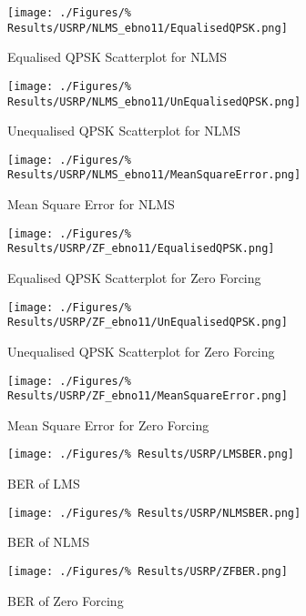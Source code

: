 \begin{figure}[ht]
	\centering
	\begin{minipage}{0.49\textwidth}
		\centering
		\texttt{[image: ./Figures/\%
		Results/USRP/NLMS\_ebno11/EqualisedQPSK.png]}
		\captionsetup{width=0.75\linewidth}
		\caption{Equalised QPSK Scatterplot for NLMS}
	\end{minipage}
	\begin{minipage}{0.49\textwidth}
		\centering
		\texttt{[image: ./Figures/\%
		Results/USRP/NLMS\_ebno11/UnEqualisedQPSK.png]}
		\captionsetup{width=0.75\linewidth}
		\caption{Unequalised QPSK Scatterplot for NLMS}
	\end{minipage}
\end{figure}
\begin{figure}[ht]
	\centering
	\texttt{[image: ./Figures/\%
	Results/USRP/NLMS\_ebno11/MeanSquareError.png]}
	\captionsetup{width=0.75\linewidth}
	\caption{Mean Square Error for NLMS}
\end{figure}

\begin{figure}[ht]
	\centering
	\begin{minipage}{0.49\textwidth}
		\centering
		\texttt{[image: ./Figures/\%
		Results/USRP/ZF\_ebno11/EqualisedQPSK.png]}
		\captionsetup{width=0.75\linewidth}
		\caption{Equalised QPSK Scatterplot for Zero 
		Forcing}
	\end{minipage}
	\begin{minipage}{0.49\textwidth}
		\centering
		\texttt{[image: ./Figures/\%
		Results/USRP/ZF\_ebno11/UnEqualisedQPSK.png]}
		\captionsetup{width=0.75\linewidth}
		\caption{Unequalised QPSK Scatterplot for Zero 
		Forcing}
	\end{minipage}
\end{figure}
\begin{figure}[ht]
	\centering
	\texttt{[image: ./Figures/\%
	Results/USRP/ZF\_ebno11/MeanSquareError.png]}
	\captionsetup{width=0.75\linewidth}
	\caption{Mean Square Error for Zero Forcing}
\end{figure}

\begin{figure}[ht]
	\centering
	\begin{minipage}{0.49\textwidth}
		\centering
		\texttt{[image: ./Figures/\%
		Results/USRP/LMSBER.png]}
		\captionsetup{width=0.75\linewidth}
		\caption{BER of LMS}
	\end{minipage}
	\begin{minipage}{0.49\textwidth}
		\centering
		\texttt{[image: ./Figures/\%
		Results/USRP/NLMSBER.png]}
		\captionsetup{width=0.75\linewidth}
		\caption{BER of NLMS}
		\label{fig:NLMS-BER-USRP}
	\end{minipage}
\end{figure}
\begin{figure}[ht]
	\centering
	\texttt{[image: ./Figures/\%
	Results/USRP/ZFBER.png]}
	\captionsetup{width=0.75\linewidth}
	\caption{BER of Zero Forcing}
\end{figure}
